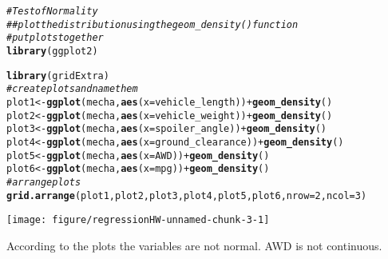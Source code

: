 \documentclass[a4paper, 12pt]{article}\usepackage[]{graphicx}\usepackage[]{color}
\makeatletter
\def\maxwidth{ %
  \ifdim\Gin@nat@width>\linewidth
    \linewidth
  \else
    \Gin@nat@width
  \fi
}
\newcommand{\hlnum}[1]{\textcolor[rgb]{0.686,0.059,0.569}{#1}}%
\newcommand{\hlcom}[1]{\textcolor[rgb]{0.678,0.584,0.686}{\textit{#1}}}%
\newcommand{\hlopt}[1]{\textcolor[rgb]{0,0,0}{#1}}%
\newcommand{\hlstd}[1]{\textcolor[rgb]{0.345,0.345,0.345}{#1}}%
\newcommand{\hlkwb}[1]{\textcolor[rgb]{0.69,0.353,0.396}{#1}}%
\newcommand{\hlkwc}[1]{\textcolor[rgb]{0.333,0.667,0.333}{#1}}%
\newcommand{\hlkwd}[1]{\textcolor[rgb]{0.737,0.353,0.396}{\textbf{#1}}}%
\newenvironment{kframe}{%
 \def\at@end@of@kframe{}%
 \ifinner\ifhmode%
  \def\at@end@of@kframe{\end{minipage}}%
  \begin{minipage}{\columnwidth}%
 \fi\fi%
 \def\FrameCommand##1{\hskip\@totalleftmargin \hskip-\fboxsep
 \colorbox{shadecolor}{##1}\hskip-\fboxsep
     \hskip-\linewidth \hskip-\@totalleftmargin \hskip\columnwidth}%
 \MakeFramed {\advance\hsize-\width
   \@totalleftmargin\z@ \linewidth\hsize
   \@setminipage}}%
 {\par\unskip\endMakeFramed%
 \at@end@of@kframe}
\newenvironment{knitrout}{}{} %
\makeatother
\begin{document}
\begin{knitrout}
\color{fgcolor}\begin{kframe}
\begin{alltt}
\hlcom{# Test of Normality}
\hlcom{# # plot the distribution using the geom_density() function}
\hlcom{# put plots together}
\hlkwd{library}\hlstd{(ggplot2)}
\end{alltt}


{\ttfamily\noindent\itshape\color{messagecolor}{\#\# \\\#\# Attaching package: 'ggplot2'}}

{\ttfamily\noindent\itshape\color{messagecolor}{\#\# The following objects are masked from 'package:psych':\\\#\# \\\#\#\ \ \ \  \%+\%, alpha}}\begin{alltt}
\hlkwd{library}\hlstd{(gridExtra)}
\hlcom{# create plots and name them}
\hlstd{plot1}\hlkwb{<-}\hlkwd{ggplot}\hlstd{(mecha,}\hlkwd{aes}\hlstd{(}\hlkwc{x}\hlstd{=vehicle_length))} \hlopt{+} \hlkwd{geom_density}\hlstd{()}
\hlstd{plot2}\hlkwb{<-}\hlkwd{ggplot}\hlstd{(mecha,}\hlkwd{aes}\hlstd{(}\hlkwc{x}\hlstd{=vehicle_weight))} \hlopt{+} \hlkwd{geom_density}\hlstd{()}
\hlstd{plot3}\hlkwb{<-}\hlkwd{ggplot}\hlstd{(mecha,}\hlkwd{aes}\hlstd{(}\hlkwc{x}\hlstd{=spoiler_angle))} \hlopt{+} \hlkwd{geom_density}\hlstd{()}
\hlstd{plot4}\hlkwb{<-}\hlkwd{ggplot}\hlstd{(mecha,}\hlkwd{aes}\hlstd{(}\hlkwc{x}\hlstd{=ground_clearance))} \hlopt{+} \hlkwd{geom_density}\hlstd{()}
\hlstd{plot5}\hlkwb{<-}\hlkwd{ggplot}\hlstd{(mecha,}\hlkwd{aes}\hlstd{(}\hlkwc{x}\hlstd{=AWD))} \hlopt{+} \hlkwd{geom_density}\hlstd{()}
\hlstd{plot6}\hlkwb{<-}\hlkwd{ggplot}\hlstd{(mecha,}\hlkwd{aes}\hlstd{(}\hlkwc{x}\hlstd{=mpg))} \hlopt{+} \hlkwd{geom_density}\hlstd{()}
\hlcom{# arrange plots }
\hlkwd{grid.arrange}\hlstd{(plot1, plot2, plot3, plot4,plot5, plot6,}  \hlkwc{nrow} \hlstd{=} \hlnum{2}\hlstd{,} \hlkwc{ncol} \hlstd{=} \hlnum{3}\hlstd{)}
\end{alltt}
\end{kframe}

{\centering \texttt{[image: figure/regressionHW-unnamed-chunk-3-1]} 

}



\end{knitrout}
According to the plots the variables are not normal. 
AWD is not continuous. 
\end{document}

